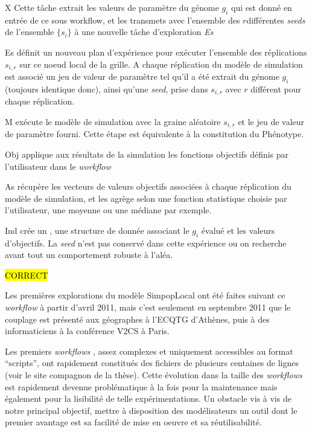 \begin{myitemize}

\item[X] Cette tâche extrait les valeurs de paramètre du génome $g_i$ qui est donné en entrée de ce sous workflow, et les transmets avec l'ensemble des $r$différentes \textit{seeds} de l'ensemble $\{s_i\}$ à une nouvelle tâche d'exploration \textit{Es}

\item[Es] définit un nouveau plan d'expérience pour exécuter l'ensemble des réplications $s_{i,r}$ sur ce noeud local de la grille. A chaque réplication du modèle de simulation est associé un jeu de valeur de paramètre tel qu'il a été extrait du génome $g_i$ (toujours identique donc), ainsi qu'une \textit{seed}, prise dans $s_{i,r}$ avec $r$ différent pour chaque réplication.

\item[M] exécute le modèle de simulation avec la graine aléatoire $s_{i,r}$ et le jeu de valeur de paramètre fourni. Cette étape est équivalente à la constitution du Phénotype.

\item[Obj] applique aux résultats de la simulation les fonctions objectifs définis par l'utilisateur dans le \textit{workflow}

\item[As] récupère les vecteurs de valeurs objectifs associées à chaque réplication du modèle de simulation, et les agrège selon une fonction statistique choisie par l'utilisateur, une moyenne ou une médiane par exemple.

\item[Ind] crée un , une structure de donnée associant le  $g_i$ évalué et les valeurs d'objectifs. La \textit{seed} n'est pas conservé dans cette expérience ou on recherche avant tout un comportement robuste à l'aléa.

\end{myitemize}

\hl{CORRECT}

Les premières explorations du modèle SimpopLocal ont été faites suivant ce \textit{workflow} à partir d'avril 2011, mais c'est seulement en septembre 2011 que le couplage est présenté aux géographes à l'ECQTG d'Athènes, puis à des informaticiens à la conférence V2CS à Paris.

Les premiers \textit{workflows} , assez complexes et uniquement accessibles au format \enquote{scripts}, ont rapidement constitués des fichiers de plusieurs centaines de lignes (voir le site compagnon de la thèse). Cette évolution dans la taille des \textit{workflows} est rapidement devenue problématique à la fois pour la maintenance mais également pour la lisibilité de telle expérimentations. Un obstacle vis à vis de notre principal objectif, mettre à disposition des modélisateurs un outil dont le premier avantage est sa facilité de mise en oeuvre et sa réutilisabilité.

